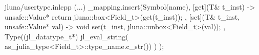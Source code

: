 \begin{fileminted}{jluna/usertype.inl}{cpp}
(...) {
    _mapping.insert({Symbol(name), {
        [get](T& t_inst) -> unsafe::Value* {
            return jluna::box<Field_t>(get(t_inst));
        },
        [set](T& t_inst, unsafe::Value* val) -> void {
            set(t_inst, jluna::unbox<Field_t>(val));
        },
        Type((jl_datatype_t*) jl_eval_string(
            as_julia_type<Field_t>::type_name.c_str())
        )
    }});
}
\end{fileminted}